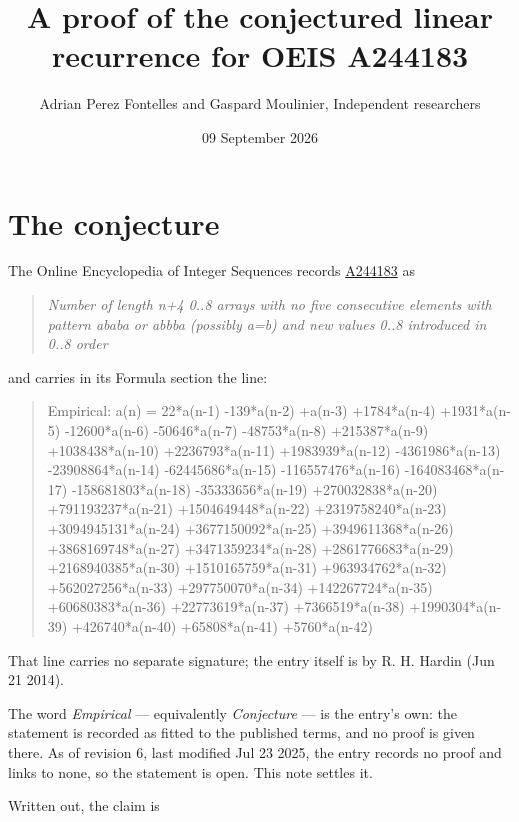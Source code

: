 \documentclass[11pt]{article}
\title{A proof of the conjectured linear recurrence for OEIS A244183}
\author{Adrian Perez Fontelles and Gaspard Moulinier, Independent researchers}
\date{09 September 2026}
\theoremstyle{definition}
\begin{document}
\maketitle
\section{The conjecture}

The Online Encyclopedia of Integer Sequences records \href{https://oeis.org/A244183}{A244183} as

\begin{quote}\itshape Number of length n+4 0..8 arrays with no five consecutive elements with pattern ababa or abbba (possibly a=b) and new values 0..8 introduced in 0..8 order\end{quote}

and carries in its Formula section the line:

\begin{quote}\ttfamily Empirical: a(n) = 22*a(n-1) -139*a(n-2) +a(n-3) +1784*a(n-4) +1931*a(n-5) -12600*a(n-6) -50646*a(n-7) -48753*a(n-8) +215387*a(n-9) +1038438*a(n-10) +2236793*a(n-11) +1983939*a(n-12) -4361986*a(n-13) -23908864*a(n-14) -62445686*a(n-15) -116557476*a(n-16) -164083468*a(n-17) -158681803*a(n-18) -35333656*a(n-19) +270032838*a(n-20) +791193237*a(n-21) +1504649448*a(n-22) +2319758240*a(n-23) +3094945131*a(n-24) +3677150092*a(n-25) +3949611368*a(n-26) +3868169748*a(n-27) +3471359234*a(n-28) +2861776683*a(n-29) +2168940385*a(n-30) +1510165759*a(n-31) +963934762*a(n-32) +562027256*a(n-33) +297750070*a(n-34) +142267724*a(n-35) +60680383*a(n-36) +22773619*a(n-37) +7366519*a(n-38) +1990304*a(n-39) +426740*a(n-40) +65808*a(n-41) +5760*a(n-42)\end{quote}

That line carries no separate signature; the entry itself is by R. H. Hardin (Jun 21 2014).

The word {\itshape Empirical} --- equivalently {\itshape Conjecture} --- is the entry's own: the statement is recorded as fitted to the published terms, and no proof is given there. As of revision 6, last modified Jul 23 2025, the entry records no proof and links to none, so the statement is open. This note settles it.

Written out, the claim is
\end{document}
